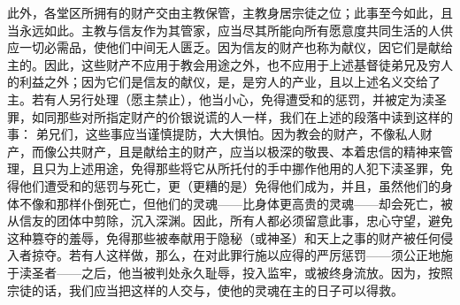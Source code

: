 此外，各堂区所拥有的财产交由主教保管，主教身居宗徒之位；此事至今如此，且当永远如此。主教与信友作为其管家，应当尽其所能向所有愿意度共同生活的人供应一切必需品，使他们中间无人匮乏。因为信友的财产也称为献仪，因它们是献给主的。因此，这些财产不应用于教会用途之外，也不应用于上述基督徒弟兄及穷人的利益之外；因为它们是信友的献仪，是，是穷人的产业，且以上述名义交给了主。若有人另行处理（愿主禁止），他当小心，免得遭受和的惩罚，并被定为渎圣罪，如同那些对所指定财产的价银说谎的人一样，我们在上述的段落中读到这样的事：  弟兄们，这些事应当谨慎提防，大大惧怕。因为教会的财产，不像私人财产，而像公共财产，且是献给主的财产，应当以极深的敬畏、本着忠信的精神来管理，且只为上述用途，免得那些将它从所托付的手中挪作他用的人犯下渎圣罪，免得他们遭受和的惩罚与死亡，更（更糟的是）免得他们成为，并且，虽然他们的身体不像和那样仆倒死亡，但他们的灵魂——比身体更高贵的灵魂——却会死亡，被从信友的团体中剪除，沉入深渊。因此，所有人都必须留意此事，忠心守望，避免这种篡夺的羞辱，免得那些被奉献用于隐秘（或神圣）和天上之事的财产被任何侵入者掠夺。若有人这样做，那么，在对此罪行施以应得的严厉惩罚——须公正地施于渎圣者——之后，他当被判处永久耻辱，投入监牢，或被终身流放。因为，按照宗徒的话，我们应当把这样的人交与，使他的灵魂在主的日子可以得救。\par


